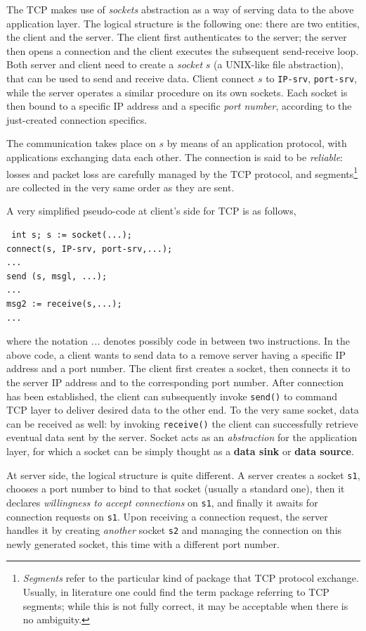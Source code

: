 \documentclass[10pt]{book}
\begin{document}
The TCP makes use of \emph{sockets} abstraction as a way of serving data to the
above application layer. The logical structure is the following one: there are
two entities, the client and the server. The client first authenticates to the
server; the server then opens a connection and the client executes the
subsequent send-receive loop. Both server and client need to create a
\emph{socket} $s$ (a UNIX-like file abstraction), that can be used to send and
receive data. Client connect $s$ to \texttt{IP-srv}, \texttt{port-srv}, while
the server operates a similar procedure on its own sockets. Each socket is then
bound to a specific IP address and a specific \emph{port number}, according to
the just-created connection specifics.

The communication takes place on $s$ by means of an application protocol, with
applications exchanging data each other. The connection is said to be
\emph{reliable}: losses and packet loss are carefully managed by the TCP
protocol, and segments\footnote{\emph{Segments} refer to the particular kind of
package that TCP protocol exchange. Usually, in literature one could find the
term package referring to TCP segments; while this is not fully correct, it may
be acceptable when there is no ambiguity.} are collected in the very same order
as they are sent.

A very simplified pseudo-code at client's side for TCP is as follows,

\begin{verbatim} int s; s := socket(...); 
connect(s, IP-srv, port-srv,...); 
...
send (s, msgl, ...); 
... 
msg2 := receive(s,...); 
... 
\end{verbatim}

where the notation \emph{...} denotes possibly code in between two
instructions. In the above code, a client wants to send data to a remove server
having a specific IP address and a port number. The client first creates a
socket, then connects it to the server IP address and to the corresponding port
number. After connection has been established, the client can subsequently
invoke \texttt{send()} to command TCP layer to deliver desired data to the
other end. To the very same socket, data can be received as well: by invoking
\texttt{receive()} the client can successfully retrieve eventual data sent by
the server. Socket acts as an \emph{abstraction} for the application layer, for
which a socket can be simply thought as a \textbf{data sink} or \textbf{data
source}.

At server side, the logical structure is quite different. A server creates
a socket \texttt{s1}, chooses a port number to bind to that socket (usually a
standard one), then it declares \emph{willingness to accept connections} on
\texttt{s1}, and finally it awaits for connection requests on \texttt{s1}. Upon
receiving a connection request, the server handles it by creating
\emph{another} socket \texttt{s2} and managing the connection on this newly
generated socket, this time with a different port number. 
\end{document}
